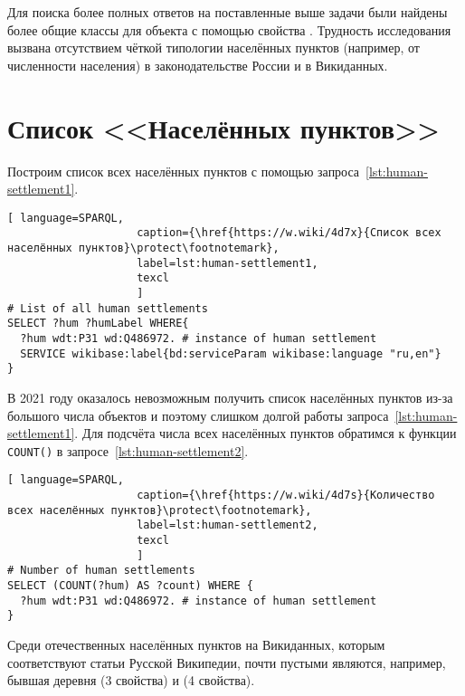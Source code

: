 Для поиска более полных ответов на поставленные выше задачи  
были найдены более общие классы для объекта  
с помощью свойства . 
Трудность исследования вызвана отсутствием чёткой типологии населённых пунктов 
(например, от численности населения) в законодательстве России и в Викиданных.



\section{Список <<Населённых пунктов>>}

Построим список всех населённых пунктов с помощью запроса~\ref{lst:human-settlement1}.

\begin{lstlisting}[ language=SPARQL, 
                    caption={\href{https://w.wiki/4d7x}{Список всех населённых пунктов}\protect\footnotemark},
                    label=lst:human-settlement1,
                    texcl 
                    ]
# List of all human settlements
SELECT ?hum ?humLabel WHERE{
  ?hum wdt:P31 wd:Q486972. # instance of human settlement
  SERVICE wikibase:label{bd:serviceParam wikibase:language "ru,en"}
}
\end{lstlisting}%

В 2021 году оказалось невозможным получить список населённых пунктов 
из-за большого числа объектов и поэтому слишком долгой работы запроса~\ref{lst:human-settlement1}. 
Для подсчёта числа всех населённых пунктов обратимся к функции \lstinline|COUNT()| 
в запросе~\ref{lst:human-settlement2}.

\begin{lstlisting}[ language=SPARQL, 
                    caption={\href{https://w.wiki/4d7s}{Количество всех населённых пунктов}\protect\footnotemark},
                    label=lst:human-settlement2,
                    texcl 
                    ]
# Number of human settlements
SELECT (COUNT(?hum) AS ?count) WHERE {
  ?hum wdt:P31 wd:Q486972. # instance of human settlement  
}
\end{lstlisting}%

Среди отечественных населённых пунктов на Викиданных, 
которым соответствуют статьи Русской Википедии, 
почти пустыми являются, например, 
бывшая деревня  (3 свойства) 
и  (4 свойства).

